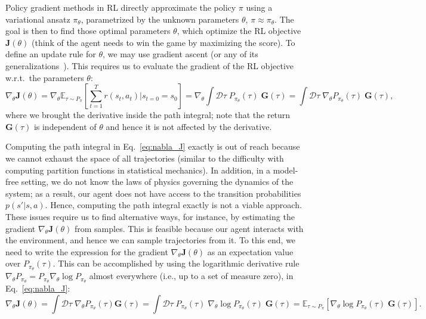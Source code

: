 Policy gradient methods in RL directly approximate the policy $\pi$ using a variational ansatz $\pi_\theta$, parametrized by the unknown parameters $\theta$, $\pi\approx\pi_\theta$. The goal is then to find those optimal parameters $\theta$, which optimize the RL objective $\mathbf J(\theta)$ (think of the agent  needs to win the game by maximizing the score). To define an update rule for $\theta$, we may use gradient ascent (or any of its generalizations~\cite{mehta2019high}). This requires us to evaluate the gradient of the RL objective w.r.t.~the parameters $\theta$:
\begin{equation}
\label{eq:nabla_J}
\nabla_\theta \mathbf J(\theta) = \nabla_\theta \mathbb{E}_{\tau\sim P_\pi} \left[ \sum_{t=1}^T r(s_t,a_t) | s_{t=0}=s_0 \right] 
= \nabla_\theta \int\mathcal{D}\tau\; P_{\pi_\theta}(\tau)\; \mathbf G(\tau)
= \int\mathcal{D}\tau\; \nabla_\theta P_{\pi_\theta}(\tau)\; \mathbf G(\tau),
\end{equation}
where we brought the derivative inside the path integral; note that the return $\mathbf G(\tau)$ is independent of $\theta$ and hence it is not affected by the derivative. 

Computing the path integral in Eq.~\eqref{eq:nabla_J} exactly is out of reach because we cannot exhaust the space of all trajectories (similar to the difficulty with computing partition functions in statistical mechanics). In addition, in a model-free setting, we do not know the laws of physics governing the dynamics of the system; as a result, our agent does not have access to the transition probabilities $p(s'|s,a)$. Hence, computing the path integral exactly is not a viable approach. These issues require us to find alternative ways, for instance, by estimating the gradient $\nabla_\theta \mathbf J(\theta)$ from samples. This is feasible because our agent interacts with the environment, and hence we can sample trajectories from it. To this end, we need to write the expression for the gradient $\nabla_\theta \mathbf J(\theta)$ as an expectation value over $P_{\pi_\theta}(\tau)$.
This can be accomplished by using the logarithmic derivative rule $\nabla_\theta P_{\pi_\theta} = P_{\pi_\theta} \nabla_\theta \log P_{\pi_\theta}$ almost everywhere (i.e., up to a set of measure zero), in Eq.~\eqref{eq:nabla_J}:
\begin{equation}
\nabla_\theta \mathbf J(\theta) = \int\mathcal{D}\tau\; \nabla_\theta P_{\pi_\theta}(\tau) \mathbf G(\tau) = \int\mathcal{D}\tau\; P_{\pi_\theta}(\tau)\; \nabla_\theta \log P_{\pi_\theta}(\tau)\; \mathbf G(\tau) = \mathbb{E}_{\tau\sim P_\pi} \left[\nabla_\theta \log P_{\pi_\theta}(\tau)\; \mathbf G(\tau)\right].
\end{equation}

